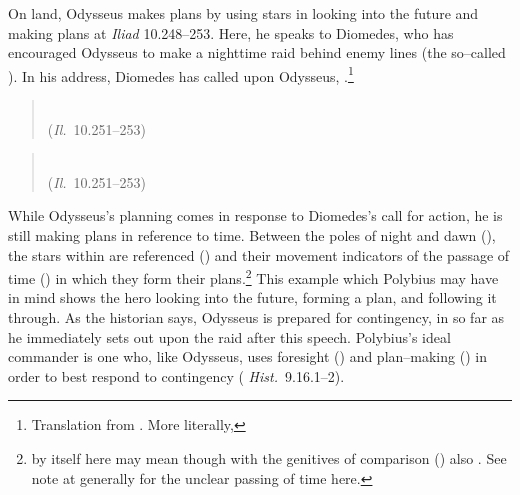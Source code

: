 \documentclass[12pt,letterpaper,oneside,final]{memoir}
\begin{document}
 On land, Odysseus makes plans by using stars in looking into the future and making plans at \emph{Iliad} 10.248--253. Here, he speaks to Diomedes, who has encouraged Odysseus to make a nighttime raid behind enemy lines (the so--called ). In his address, Diomedes has called upon Odysseus, .\footnote{Translation from \textcite{murray1928}. More literally, } \begin{verse}\SingleSpacing {} \\ (\emph{Il.}~10.251--253)\end{verse} \begin{verse} \SingleSpacing {} \\ (\emph{Il.}~10.251--253)\end{verse}\DoubleSpacing While Odysseus's planning comes in response to Diomedes's call for action, he is still making plans in reference to time. Between the poles of night and dawn (), the stars within are referenced () and their movement indicators of the passage of time () in which they form their plans.\footnote{ by itself here may mean  though with the genitives of comparison () also  \parencite[177]{hainsworth1993}. See note at \textcite[177]{hainsworth1993} generally for the unclear passing of time here.} This example which Polybius may have in mind shows the hero looking into the future, forming a plan, and following it through. As the historian says, Odysseus is prepared for contingency, in so far as he immediately sets out upon the raid after this speech. Polybius's ideal commander is one who, like Odysseus, uses foresight () and plan--making () in order to best respond to contingency ( \emph{Hist.}~9.16.1--2).
\end{document}
